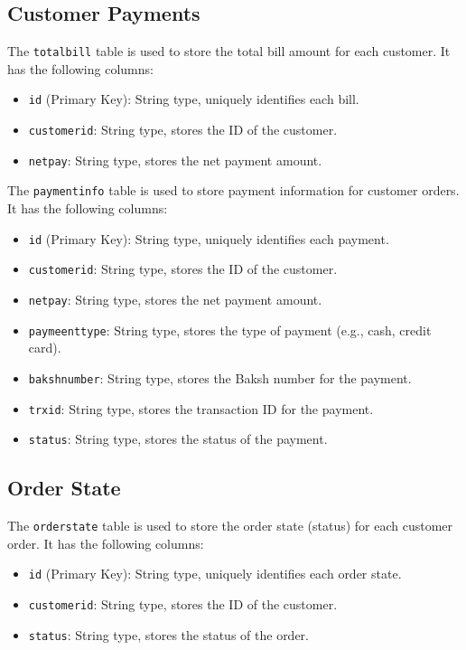 \subsection{Customer Payments}

The \texttt{totalbill} table is used to store the total bill amount for each customer. It has the following columns:

\begin{itemize}
    \item \texttt{id} (Primary Key): String type, uniquely identifies each bill.
    \item \texttt{customerid}: String type, stores the ID of the customer.
    \item \texttt{netpay}: String type, stores the net payment amount.
\end{itemize}

The \texttt{paymentinfo} table is used to store payment information for customer orders. It has the following columns:

\begin{itemize}
    \item \texttt{id} (Primary Key): String type, uniquely identifies each payment.
    \item \texttt{customerid}: String type, stores the ID of the customer.
    \item \texttt{netpay}: String type, stores the net payment amount.
    \item \texttt{paymeenttype}: String type, stores the type of payment (e.g., cash, credit card).
    \item \texttt{bakshnumber}: String type, stores the Baksh number for the payment.
    \item \texttt{trxid}: String type, stores the transaction ID for the payment.
    \item \texttt{status}: String type, stores the status of the payment.
\end{itemize}

\subsection{Order State}

The \texttt{orderstate} table is used to store the order state (status) for each customer order. It has the following columns:

\begin{itemize}
    \item \texttt{id} (Primary Key): String type, uniquely identifies each order state.
    \item \texttt{customerid}: String type, stores the ID of the customer.
    \item \texttt{status}: String type, stores the status of the order.
\end{itemize}

